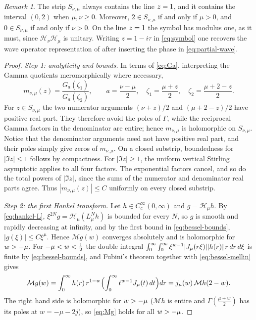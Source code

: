 \documentclass[11pt,a4paper,reqno,backref=page]{amsart}
\newcommand{\HH}{\mathcal H}                 %
\newcommand{\Mell}{\mathcal M}               %
\newcommand{\dd}{\,d}
\let\Re\relax\DeclareMathOperator{\Re}{Re}
\numberwithin{equation}{section}
\theoremstyle{definition}
\theoremstyle{remark}
\newtheorem{remark}[theorem]{Remark}
\begin{document}
\begin{remark}
The strip $S_{\nu,\mu}$ always contains the line $\Re z=1$, and
it contains the interval $(0,2)$ when $\mu,\nu\ge0$. Moreover,
$2\in S_{\nu,\mu}$ if and only if $\mu>0$, and $0\in
S_{\nu,\mu}$ if and only if $\nu>0$. On the line $\Re z=1$ the
symbol has modulus one, as it must, since $\HH_\nu\HH_\mu$ is
unitary. Writing $z=1-i\tau$ in \eqref{eq:symbol} one recovers
the wave operator representation of
\cite{Richard2009,PankrashkinRichard2011} after inserting the
phase in \eqref{eq:partial-wave}.
\end{remark}

\begin{proof}
\emph{Step 1: analyticity and bounds.} In terms of
\eqref{eq:Ga}, interpreting the Gamma quotients meromorphically
where necessary,
\begin{equation}\label{eq:symbol-G}
  m_{\nu,\mu}(z)=\frac{G_a(\zeta_1)}{G_a(\zeta_2)},\qquad
  a=\frac{\nu-\mu}2,\quad \zeta_1=\frac{\mu+z}{2},\quad
  \zeta_2=\frac{\mu+2-z}{2}.
\end{equation}
For $z\in S_{\nu,\mu}$ the two numerator arguments $(\nu+z)/2$
and $(\mu+2-z)/2$ have positive real part. They therefore avoid
the poles of $\Gamma$, while the reciprocal Gamma factors in the
denominator are entire; hence $m_{\nu,\mu}$ is holomorphic on
$S_{\nu,\mu}$. Notice that the denominator arguments need not
have positive real part, and their poles simply give zeros of
$m_{\nu,\mu}$. On a closed substrip, boundedness for $|\Im
z|\le1$ follows by compactness. For $|\Im z|\ge1$, the uniform
vertical Stirling asymptotic \cite[Eq.~5.11.9]{NIST} applies to
all four factors. The exponential factors cancel, and so do the
total powers of $|\Im z|$, since the sums of the numerator and
denominator real parts agree. Thus $|m_{\nu,\mu}(z)|\le C$
uniformly on every closed substrip.

\emph{Step 2: the first Hankel transform.} Let $h\in
C_c^\infty(0,\infty)$ and $g=\HH_\mu h$. By \eqref{eq:hankel-L},
$\xi^{2N}g=\HH_\mu(L_\mu^Nh)$ is bounded for every $N$, so $g$
is smooth and rapidly decreasing at infinity, and by the first
bound in \eqref{eq:bessel-bounds}, $|g(\xi)|\le C\xi^\mu$. Hence
$\Mell g(w)$ converges absolutely and is holomorphic for $\Re
w>-\mu$. For $-\mu<\Re w<\frac12$ the double integral
$\int_0^\infty\int_0^\infty\xi^{\Re
w-1}|J_\mu(r\xi)||h(r)|\,r\,dr\,d\xi$ is finite by
\eqref{eq:bessel-bounds}, and Fubini's theorem together with
\eqref{eq:bessel-mellin} gives
\begin{equation}\label{eq:Mg}
  \Mell g(w)=\int_0^\infty h(r)\,r^{1-w}\Bigl(\int_0^\infty
  t^{w-1}J_\mu(t)\dd t\Bigr)dr
  =j_\mu(w)\,\Mell h(2-w).
\end{equation}
The right hand side is holomorphic for $\Re w>-\mu$ ($\Mell h$
is entire and $\Gamma(\frac{\mu+w}2)$ has its poles at
$w=-\mu-2j$), so \eqref{eq:Mg} holds for all $\Re w>-\mu$.


\end{proof}
\end{document}
